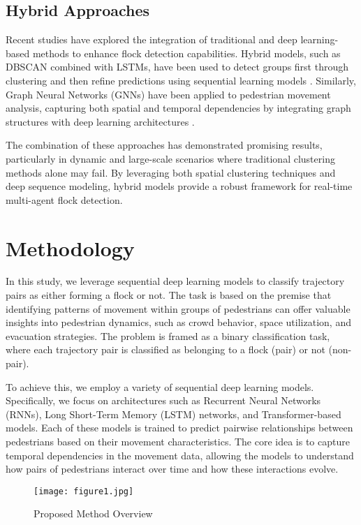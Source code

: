 \documentclass{article}
\begin{document}
\subsection{Hybrid Approaches}

Recent studies have explored the integration of traditional and deep learning-based methods to enhance flock detection capabilities. Hybrid models, such as DBSCAN combined with LSTMs, have been used to detect groups first through clustering and then refine predictions using sequential learning models \cite{jia2020trajectory}. Similarly, Graph Neural Networks (GNNs) have been applied to pedestrian movement analysis, capturing both spatial and temporal dependencies by integrating graph structures with deep learning architectures \cite{zhang2020graph}.

The combination of these approaches has demonstrated promising results, particularly in dynamic and large-scale scenarios where traditional clustering methods alone may fail. By leveraging both spatial clustering techniques and deep sequence modeling, hybrid models provide a robust framework for real-time multi-agent flock detection.



\section{Methodology}

In this study, we leverage sequential deep learning models to classify trajectory pairs as either forming a flock or not. The task is based on the premise that identifying patterns of movement within groups of pedestrians can offer valuable insights into pedestrian dynamics, such as crowd behavior, space utilization, and evacuation strategies. The problem is framed as a binary classification task, where each trajectory pair is classified as belonging to a flock (pair) or not (non-pair).

To achieve this, we employ a variety of sequential deep learning models. Specifically, we focus on architectures such as Recurrent Neural Networks (RNNs), Long Short-Term Memory (LSTM) networks, and Transformer-based models. Each of these models is trained to predict pairwise relationships between pedestrians based on their movement characteristics. The core idea is to capture temporal dependencies in the movement data, allowing the models to understand how pairs of pedestrians interact over time and how these interactions evolve.

\begin{figure}[H] 
    \centering
    \ifpdf
        \texttt{[image: figure1.jpg]}  %
    \fi
    \caption{Proposed Method Overview}
    \label{fig:proposed_method}
\end{figure}
\end{document}
